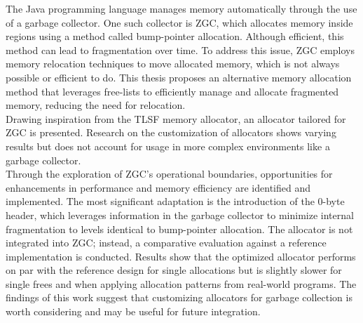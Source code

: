 
The Java programming language manages memory automatically through the use of a garbage collector. One such collector is ZGC, which allocates memory inside regions using a method called bump-pointer allocation. Although efficient, this method can lead to fragmentation over time. To address this issue, ZGC employs memory relocation techniques to move allocated memory, which is not always possible or efficient to do. This thesis proposes an alternative memory allocation method that leverages free-lists to efficiently manage and allocate fragmented memory, reducing the need for relocation.\\

Drawing inspiration from the TLSF memory allocator, an allocator tailored for ZGC is presented. Research on the customization of allocators shows varying results but does not account for usage in more complex environments like a garbage collector.\\

Through the exploration of ZGC's operational boundaries, opportunities for enhancements in performance and memory efficiency are identified and implemented. The most significant adaptation is the introduction of the 0-byte header, which leverages information in the garbage collector to minimize internal fragmentation to levels identical to bump-pointer allocation. The allocator is not integrated into ZGC; instead, a comparative evaluation against a reference implementation is conducted. Results show that the optimized allocator performs on par with the reference design for single allocations but is slightly slower for single frees and when applying allocation patterns from real-world programs. The findings of this work suggest that customizing allocators for garbage collection is worth considering and may be useful for future integration.\\

